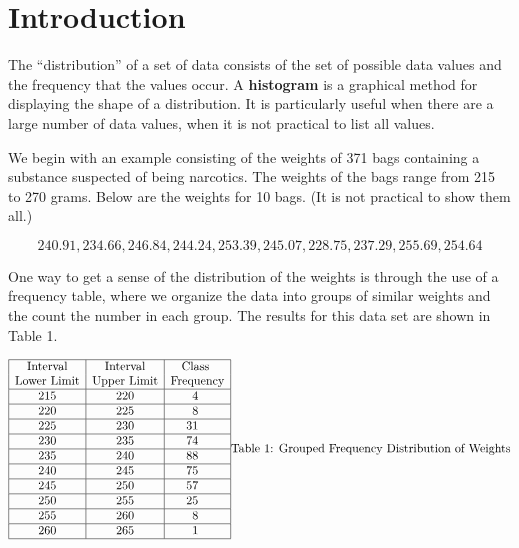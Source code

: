 \documentclass[
]{book}
\begin{document}
\hypertarget{introduction-1}{%
\section{Introduction}\label{introduction-1}}

The ``distribution'' of a set of data consists of the set of possible data values and the
frequency that the values occur.
A \textbf{histogram} is a graphical method for displaying the shape of a distribution.
It is particularly useful when there are a large number of data values, when
it is not practical to list all values.

We begin with an example consisting of the weights of 371 bags containing a
substance suspected of being narcotics. The weights of the bags range from
215 to 270 grams. Below are the weights for 10 bags. (It is not
practical to show them all.)

\[
240.91, 234.66, 246.84, 244.24, 253.39, 245.07, 228.75, 237.29, 255.69, 254.64
\]

One way to get a sense of the distribution of the weights is through the
use of a frequency table, where we organize the data into groups of similar
weights and the count the number in each group. The results for this
data set are shown in Table 1.

\[
\begin{array}{|c|c|r|} \hline
\mathrm{Interval} & \mathrm{Interval} & \mathrm{Class}\hspace{.175in}\\
\text{Lower Limit} & \text{Upper Limit} & \mathrm{Frequency} \\ \hline
215 & 220 & 4\hspace{.3in} \\  \hline
220 & 225  & 8\hspace{.3in} \\  \hline
225 & 230 & 31\hspace{.3in} \\  \hline
230 & 235 & 74\hspace{.3in} \\  \hline
235 & 240 & 88\hspace{.3in} \\  \hline
240 & 245 & 75\hspace{.3in} \\  \hline
245 & 250 & 57\hspace{.3in} \\  \hline
250 & 255 & 25\hspace{.3in} \\  \hline
255 & 260 & 8\hspace{.3in} \\  \hline
260 & 265 & 1\hspace{.3in} \\  \hline
\end{array}\\
\mbox{Table 1: Grouped Frequency Distribution of Weights}
\]
\end{document}
